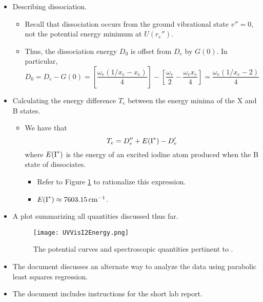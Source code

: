 \documentclass[../notes.tex]{subfiles}
\begin{document}
\begin{itemize}
\begin{itemize}
\begin{itemize}
            \item Recall that the force constant $k_e$ is equal to the curvature at the bottom of the well, i.e.,
            \begin{equation*}
                k_e = \left( \pdv[2]{U(r)}{r} \right)_{r_e}
                = \mu(2\pi c\omega_e)^2
            \end{equation*}
            where $\mu$ is the reduced mass of the system in question and $c$ is the speed of light in \si{\centi\meter\per\second}.
        \end{itemize}
    \end{itemize}
    \item Describing dissociation.
    \begin{itemize}
        \item Recall that dissociation occurs from the ground vibrational state $v''=0$, not the potential energy minimum at $U(r_e'')$.
        \item Thus, the dissociation energy $D_0$ is offset from $D_e$ by $G(0)$. In particular,
        \begin{equation*}
            D_0 = D_e-G(0)
            = \left[ \frac{\omega_e(1/x_e-x_e)}{4} \right]-\left[ \frac{\omega_e}{2}-\frac{\omega_ex_e}{4} \right]
            = \frac{\omega_e(1/x_e-2)}{4}
        \end{equation*}
    \end{itemize}
    \item Calculating the energy difference $T_e$ between the energy minima of the X and B states.
    \begin{itemize}
        \item We have that
        \begin{equation*}
            T_e = D_e''+E(\ce{I^*})-D_e'
        \end{equation*}
        where $E(\ce{I^*})$ is the energy of an excited iodine atom produced when the B state of  dissociates.
        \begin{itemize}
            \item Refer to Figure \ref{fig:UVVisI2Energy} to rationalize this expression.
            \item $E(\ce{I^*})\approx\SI{7603.15}{\per\centi\meter}$.
        \end{itemize}
    \end{itemize}
    \item A plot summarizing all quantities discussed thus far.
    \begin{figure}[H]
        \centering
        \texttt{[image: UVVisI2Energy.png]}
        \caption{The potential curves and spectroscopic quantities pertinent to .}
        \label{fig:UVVisI2Energy}
    \end{figure}
    \item The document discusses an alternate way to analyze the data using parabolic least squares regression.
    \item The document includes instructions for the short lab report.
\end{itemize}
\end{document}
